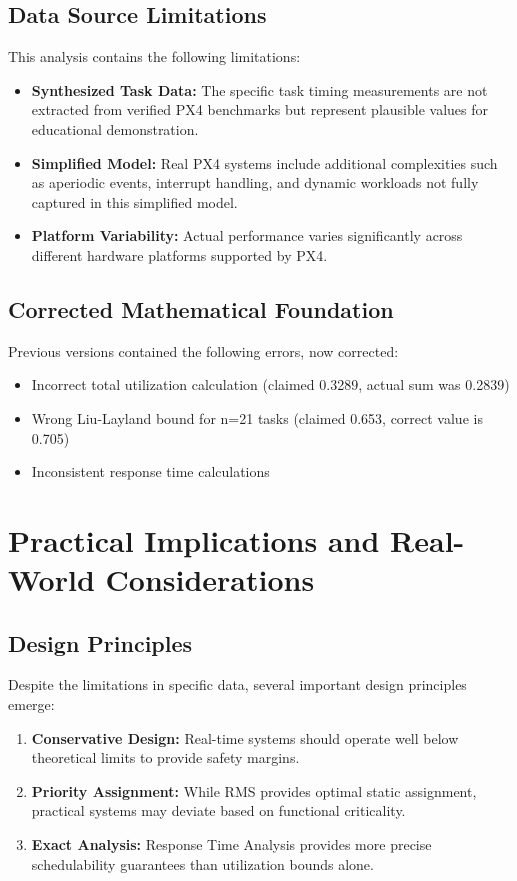 \documentclass[12pt,a4paper]{article}
\begin{document}
\subsection{Data Source Limitations}

This analysis contains the following limitations:

\begin{itemize}
\item \textbf{Synthesized Task Data:} The specific task timing measurements are not extracted from verified PX4 benchmarks but represent plausible values for educational demonstration.
\item \textbf{Simplified Model:} Real PX4 systems include additional complexities such as aperiodic events, interrupt handling, and dynamic workloads not fully captured in this simplified model.
\item \textbf{Platform Variability:} Actual performance varies significantly across different hardware platforms supported by PX4.
\end{itemize}

\subsection{Corrected Mathematical Foundation}

Previous versions contained the following errors, now corrected:
\begin{itemize}
\item Incorrect total utilization calculation (claimed 0.3289, actual sum was 0.2839)
\item Wrong Liu-Layland bound for n=21 tasks (claimed 0.653, correct value is 0.705)
\item Inconsistent response time calculations
\end{itemize}

\section{Practical Implications and Real-World Considerations}

\subsection{Design Principles}

Despite the limitations in specific data, several important design principles emerge:

\begin{enumerate}
\item \textbf{Conservative Design:} Real-time systems should operate well below theoretical limits to provide safety margins.
\item \textbf{Priority Assignment:} While RMS provides optimal static assignment, practical systems may deviate based on functional criticality.
\item \textbf{Exact Analysis:} Response Time Analysis provides more precise schedulability guarantees than utilization bounds alone.
\end{enumerate}
\end{document}
